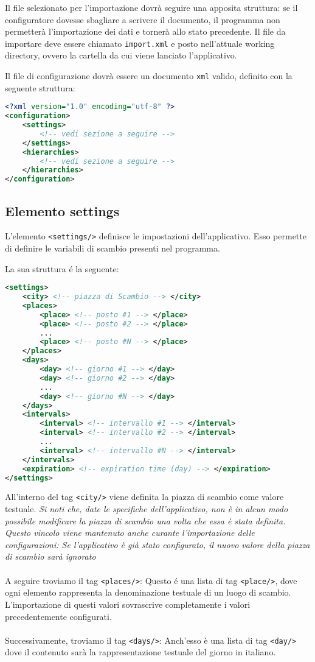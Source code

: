 \lstset{style=mystyle}

Il file selezionato per l'importazione dovrà seguire una apposita struttura: se il configuratore dovesse sbagliare a scrivere il documento, il programma non permetterà l'importazione dei dati e tornerà allo stato precedente.
Il file da importare deve essere chiamato \texttt{import.xml} e posto nell'attuale working directory, ovvero la cartella da cui viene lanciato l'applicativo.

Il file di configurazione dovrà essere un documento \texttt{xml} valido, definito con la seguente struttura:
\begin{lstlisting}[language=XML]
<?xml version="1.0" encoding="utf-8" ?>
<configuration>
    <settings>
        <!-- vedi sezione a seguire -->
    </settings>
    <hierarchies>
        <!-- vedi sezione a seguire -->
    </hierarchies>
</configuration>
\end{lstlisting}

\subsection{Elemento settings}
L'elemento \verb|<settings/>| definisce le impostazioni dell'applicativo.
Esso permette di definire le variabili di scambio presenti nel programma.

La sua struttura é la seguente:
\begin{lstlisting}[language=XML]
<settings>
    <city> <!-- piazza di Scambio --> </city>
    <places>
        <place> <!-- posto #1 --> </place>
        <place> <!-- posto #2 --> </place>
        ...
        <place> <!-- posto #N --> </place>
    </places>
    <days>
        <day> <!-- giorno #1 --> </day>
        <day> <!-- giorno #2 --> </day>
        ...
        <day> <!-- giorno #N --> </day>
    </days>
    <intervals>
        <interval> <!-- intervallo #1 --> </interval>
        <interval> <!-- intervallo #2 --> </interval>
        ...
        <interval> <!-- intervallo #N --> </interval>
    </intervals>
    <expiration> <!-- expiration time (day) --> </expiration>
</settings>
\end{lstlisting}

All'interno del tag \verb|<city/>| viene definita la piazza di scambio come valore testuale.
\textit{Si noti che, date le specifiche dell'applicativo, non è in alcun modo possibile modificare la piazza di scambio una volta che essa è stata definita.}
\textit{Questo vincolo viene mantenuto anche curante l'importazione delle configurazioni: Se l'applicativo è già stato configurato, il nuovo valore della piazza di scambio sarà ignorato}
\\\\
A seguire troviamo il tag \verb|<places/>|: Questo é una lista di tag \verb|<place/>|, dove ogni elemento rappresenta la denominazione testuale di un luogo di scambio.
L'importazione di questi valori sovrascrive completamente i valori precedentemente configurati.
\\\\
Successivamente, troviamo il tag \verb|<days/>|: Anch'esso è una lista di tag \verb|<day/>| dove il contenuto sarà la rappresentazione testuale del giorno in italiano.

